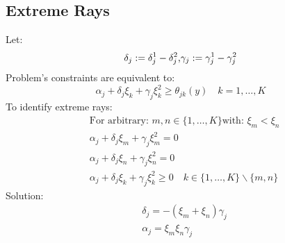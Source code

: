 \documentclass{beamer}
\begin{document}
\subsection{Extreme Rays}
\begin{frame} Let:
	\begin{equation}
		\delta_j:=\delta_j^1-\delta_j^2 \text, \gamma_j:=\gamma_j^1-\gamma_j^2
	\end{equation}
	Problem's constraints are equivalent to:
	\begin{equation}
		\alpha_j+\delta_j \xi_k+\gamma_j \xi_k^2 \geq \theta_{j k}(y) \quad k=1, \ldots, K
		\end{equation}
	To identify extreme rays:
	\begin{equation}
		\begin{aligned}
		& \text{For arbitrary: } m, n \in\{1, \ldots, K\} \text{with: } \xi_m<\xi_n\\
		& \alpha_j+\delta_j \xi_m+\gamma_j \xi_m^2=0 \\
		& \alpha_j+\delta_j \xi_n+\gamma_j \xi_n^2=0 \\
		& \alpha_j+\delta_j \xi_k+\gamma_j \xi_k^2 \geq 0 \quad k \in\{1, \ldots, K\} \backslash\{m, n\}
		\end{aligned}
	\end{equation}
	Solution:
	\begin{equation}
		\begin{aligned}
		& \delta_j= -(\xi_m+\xi_n)\gamma_j \\
		& \alpha_j=\xi_m\xi_n\gamma_j\\
		\end{aligned}
	\end{equation}
\end{frame}	
\end{document}
